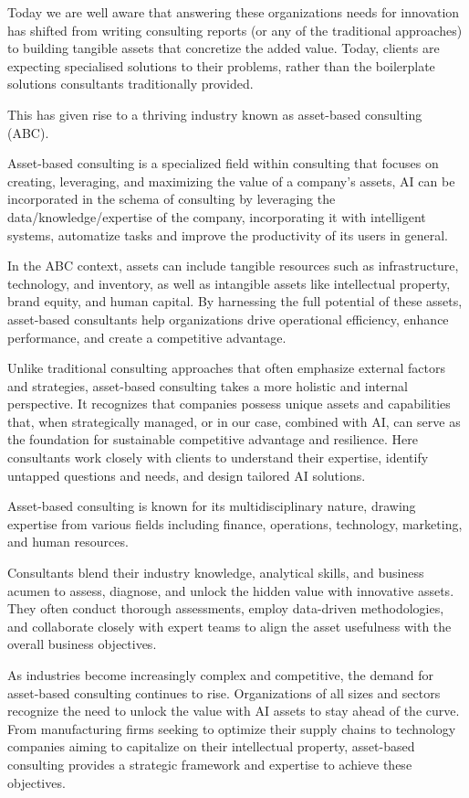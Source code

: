 \documentclass[a4paper,12pt]{article}
\begin{document}
Today we are well aware that answering these organizations needs for innovation has shifted from writing consulting reports (or any of the traditional approaches) to building tangible assets that concretize the added value. Today, clients are expecting specialised solutions to their problems, rather than the boilerplate solutions consultants traditionally provided.

This has given rise to a thriving industry known as asset-based consulting (ABC).

Asset-based consulting is a specialized field within consulting that focuses on creating, leveraging, and maximizing the value of a company's assets, 
AI can be incorporated in the schema of consulting by leveraging the data/knowledge/expertise of the company, incorporating it with intelligent systems, 
automatize tasks and improve the productivity of its users in general. 

In the ABC context, assets can include tangible resources such as infrastructure, 
technology, and inventory, as well as intangible assets like intellectual property, brand equity, and human capital. 
By harnessing the full potential of these assets, asset-based consultants help organizations drive operational efficiency, 
enhance performance, and create a competitive advantage.

Unlike traditional consulting approaches that often emphasize external factors and strategies, 
asset-based consulting takes a more holistic and internal perspective. 
It recognizes that companies possess unique assets and capabilities that, when strategically managed, or in our case, combined with AI, 
can serve as the foundation for sustainable competitive advantage and resilience. 
Here consultants work closely with clients to understand their expertise, identify untapped questions and needs, and design tailored AI solutions.

Asset-based consulting is known for its multidisciplinary nature, drawing expertise from various fields including finance, 
operations, technology, marketing, and human resources. 

Consultants blend their industry knowledge, analytical skills, and business acumen to assess, 
diagnose, and unlock the hidden value with innovative assets. They often conduct thorough assessments, employ data-driven methodologies, and collaborate closely with expert teams 
to align the asset usefulness with the overall business objectives.

As industries become increasingly complex and competitive, the demand for asset-based consulting continues to rise. 
Organizations of all sizes and sectors recognize the need to unlock the value with AI assets to stay ahead of the curve. 
From manufacturing firms seeking to optimize their supply chains to technology companies aiming to capitalize on their intellectual property, 
asset-based consulting provides a strategic framework and expertise to achieve these objectives.
\end{document}
